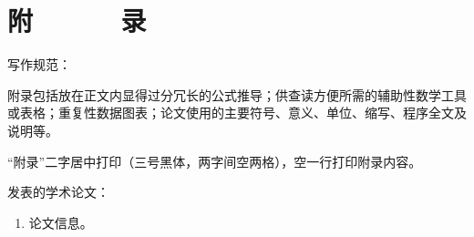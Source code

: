 
\chapter*{附~~~~~~录}

\begin{appendix}
\vspace{1em}




写作规范：

附录包括放在正文内显得过分冗长的公式推导；供查读方便所需的辅助性数学工具或表格；重复性数据图表；论文使用的主要符号、意义、单位、缩写、程序全文及说明等。 

“附录”二字居中打印（三号黑体，两字间空两格），空一行打印附录内容。

\end{appendix}

发表的学术论文：
\begin{enumerate}
    \item 论文信息。
\end{enumerate}


